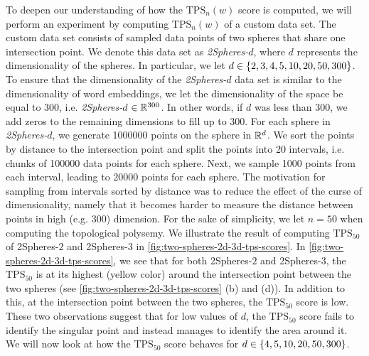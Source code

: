 To deepen our understanding of how the $\text{TPS}_n(w)$ score is computed, we will perform an experiment by computing $\text{TPS}_n(w)$ of a custom data set. The custom data set consists of sampled data points of two spheres that share one intersection point. We denote this data set as \textit{2Spheres-$d$}, where $d$ represents the dimensionality of the spheres. In particular, we let $d \in \left\{2, 3, 4, 5, 10, 20, 50, 300\right\}$. To ensure that the dimensionality of the \textit{2Spheres-$d$} data set is similar to the dimensionality of word embeddings, we let the dimensionality of the space be equal to 300, i.e. \textit{2Spheres-$d$} $\in \mathbb{R}^{300}$. In other words, if $d$ was less than 300, we add zeros to the remaining dimensions to fill up to 300. For each sphere in \textit{2Spheres-$d$}, we generate 1000000 points on the sphere in $\mathbb{R}^d$. We sort the points by distance to the intersection point and split the points into 20 intervals, i.e. chunks of 100000 data points for each sphere. Next, we sample 1000 points from each interval, leading to 20000 points for each sphere. The motivation for sampling from intervals sorted by distance was to reduce the effect of the curse of dimensionality, namely that it becomes harder to measure the distance between points in high (e.g. 300) dimension. For the sake of simplicity, we let $n=50$ when computing the topological polysemy. We illustrate the result of computing $\text{TPS}_{50}$ of 2Spheres-$2$ and 2Spheres-$3$ in \cref{fig:two-spheres-2d-3d-tps-scores}. In \cref{fig:two-spheres-2d-3d-tps-scores}, we see that for both 2Spheres-$2$ and 2Spheres-$3$, the $\text{TPS}_{50}$ is at its highest (yellow color) around the intersection point between the two spheres (see \cref{fig:two-spheres-2d-3d-tps-scores} (b) and (d)). In addition to this, at the intersection point between the two spheres, the $\text{TPS}_{50}$ score is low. These two observations suggest that for low values of $d$, the $\text{TPS}_{50}$ score fails to identify the singular point and instead manages to identify the area around it. We will now look at how the $\text{TPS}_{50}$ score behaves for $d \in \left\{4, 5, 10, 20, 50, 300\right\}$.
